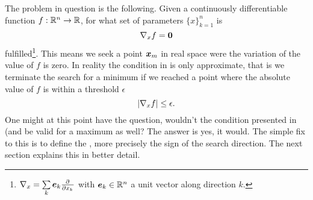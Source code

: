     The problem in question is the following. Given a continuously
    differentiable function $f:\mathbb{R}^n\rightarrow\mathbb{R}$, for what set of
    parameters $\{x\}^{n}_{k=1}$ is 
        \begin{equation}
            \nabla_{x} f = \boldsymbol{{0}}
            \label{eq:mincondition}
        \end{equation}
    fulfilled\footnote{$\nabla_{x}=\sum\limits_k\blds{e}_k\prd{x_k}$ with
    $\boldsymbol{{e}}_k\in\mathbb{R}^n$ a unit vector along direction $k$.}. This means
    we seek a point $\boldsymbol{{x}}_m$ in real space were the variation of the value
    of $f$ is zero. In reality the condition in  is only
    approximate, that is we terminate the search for a minimum if we reached a
    point where the absolute value of $f$ is within a threshold
    $\epsilon$
        \begin{equation}
            \abs{\nabla_{x} f} \leq \epsilon.
            \label{eq:minconditionapprox}
        \end{equation}
    One might at this point have the question, wouldn't the condition presented
    in (and  be valid for a
    maximum as well? The answer is yes, it would. The simple fix to this is to
    define the , more precisely the sign of the search
    direction. The next section explains this in better detail.

